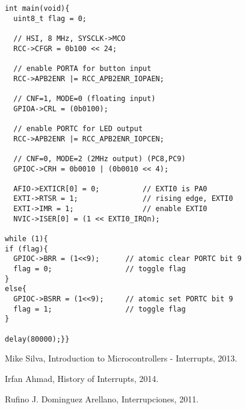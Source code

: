 \documentclass[12pt,a4paper]{report}
\begin{document}
    \begin{verbatim}
int main(void){
  uint8_t flag = 0;

  // HSI, 8 MHz, SYSCLK->MCO
  RCC->CFGR = 0b100 << 24;      
  
  // enable PORTA for button input
  RCC->APB2ENR |= RCC_APB2ENR_IOPAEN;  
  
  // CNF=1, MODE=0 (floating input)
  GPIOA->CRL = (0b0100);        

  // enable PORTC for LED output
  RCC->APB2ENR |= RCC_APB2ENR_IOPCEN; 
  
  // CNF=0, MODE=2 (2MHz output) (PC8,PC9)
  GPIOC->CRH = 0b0010 | (0b0010 << 4);     

  AFIO->EXTICR[0] = 0;          // EXTI0 is PA0
  EXTI->RTSR = 1;               // rising edge, EXTI0
  EXTI->IMR = 1;                // enable EXTI0
  NVIC->ISER[0] = (1 << EXTI0_IRQn);

while (1){
if (flag){
  GPIOC->BRR = (1<<9);      // atomic clear PORTC bit 9
  flag = 0;                 // toggle flag
}
else{
  GPIOC->BSRR = (1<<9);     // atomic set PORTC bit 9
  flag = 1;                 // toggle flag
}

delay(80000);}}
\end{verbatim}
    

\begin{thebibliography}{0}



   Mike Silva, Introduction to Microcontrollers - Interrupts, 2013.
  
   Irfan Ahmad, History of Interrupts, 2014.
  
   Rufino J. Dominguez Arellano, Interrupciones, 2011.
  
\end{thebibliography}
\end{document}
